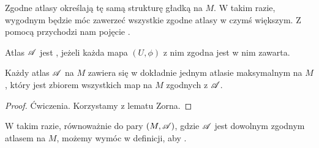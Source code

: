 Zgodne atlasy określają tę samą strukturę gładką na $M$. W takim razie, wygodnym będzie móc zawerzeć wszystkie zgodne atlasy w czymś większym. Z pomocą przychodzi nam pojęcie .
\begin{definition}
    Atlas $\mathcal{A}$ jest , jeżeli każda mapa $(U,\phi)$ z nim zgodna jest w nim zawarta.
\end{definition}

%
%
%
%

\begin{fact}
    Każdy atlas $\mathcal{A}$ na $M$ zawiera się w dokładnie jednym atlasie maksymalnym na $M$, który jest zbiorem wszystkich map na $M$ zgodnych z $\mathcal{A}$.
\begin{proof}
Ćwiczenia. Korzystamy z lematu Zorna.
\end{proof}
\end{fact}

W takim razie, równoważnie do pary $(M, \mathcal{A})$, gdzie $\mathcal{A}$ jest dowolnym zgodnym atlasem na $M$, możemy wymóc w definicji, aby .

%
%

